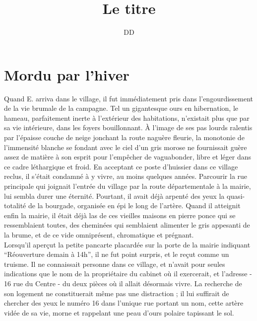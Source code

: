 \documentclass[french,amstex,12pt,a5paper]{book}
\begin{document}
\title{Le titre}
\author{DD}
\maketitle

\tableofcontents

\chapter{Mordu par l'hiver}

Quand E. arriva dans le village, il fut immédiatement pris dans l'engourdissement de la vie brumale de la campagne. Tel un gigantesque ours en hibernation, le hameau, parfaitement inerte à l'extérieur des habitations, n'existait plus que par sa vie intérieure, dans les foyers bouillonnant. À l'image de ses pas lourds ralentis par l'épaisse couche de neige jonchant la route naguère fleurie, la monotonie de l'immensité blanche se fondant avec le ciel d'un gris morose ne fournissait guère assez de matière à son esprit pour l'empêcher de vaguabonder, libre et léger dans ce cadre léthargique et froid. En acceptant ce poste d'huissier dans ce village reclus, il s'était condamné à y vivre, au moins quelques années. Parcourir la rue principale qui joignait l'entrée du village par la route départementale à la mairie, lui sembla durer une éternité. Pourtant, il avait déjà arpenté des yeux la quasi-totalité de la bourgade, organisée en épi le long de l'artère. Quand il atteignit enfin la mairie, il était déjà las de ces vieilles maisons en pierre ponce qui se ressemblaient toutes, des cheminées qui semblaient alimenter le gris appesanti de la brume, et de ce vide omniprésent, chromatique et prégnant.\\

Lorsqu'il aperçut la petite pancarte placardée sur la porte de la mairie indiquant ``Réouverture demain à 14h'', il ne fut point surpris, et le reçut comme un truisme. Il ne connaissait personne dans ce village, et n'avait pour seules indications que le nom de la propriétaire du cabinet où il exercerait, et l'adresse - 16 rue du Centre - du deux pièces où il allait désormais vivre. La recherche de son logement ne constituerait même pas une distraction ; il lui suffirait de chercher des yeux le numéro 16 dans l'unique rue portant un nom, cette artère vidée de sa vie, morne et rappelant une peau d'ours polaire tapissant le sol.
\end{document}
